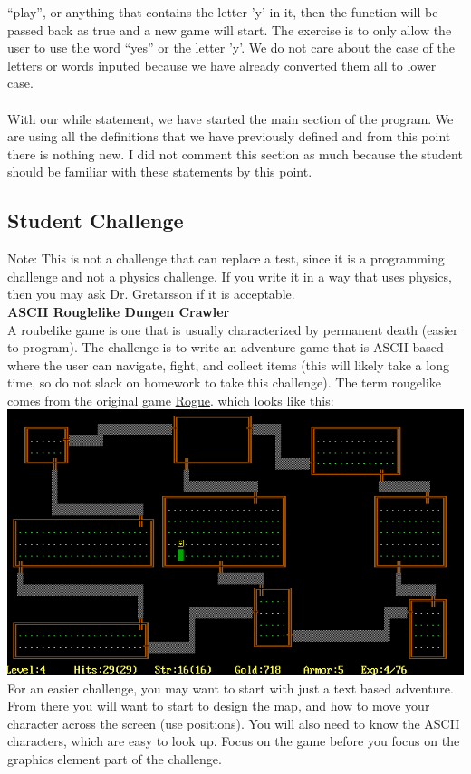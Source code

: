 \documentclass[11pt]{article}   %
\begin{document}
``play'', or anything that contains the letter 'y' in it, then the function will be passed back as true and a 
new game will start.  The exercise is to only allow the user to use the word ``yes'' or the letter 'y'.  We do 
not care about the case of the letters or words inputed because we have already converted them all to  lower case.
\\
\\
With our while statement, we have started the main section of the program.  We are using all the definitions that 
we have previously defined and from this point there is nothing new.  I did not comment this section as much
because the student should be familiar with these statements by this point.

\subsection*{Student Challenge}
Note: This is not a challenge that can replace a test, since it is a programming challenge and not a physics challenge.  If you write it in a way that uses physics, then you may ask Dr. Gretarsson if it is acceptable.
\\\textbf{ASCII Rouglelike Dungen Crawler}\\
A roubelike game is one that is usually characterized by permanent death (easier to program).  The challenge is to
write an adventure game that is ASCII based where the user can navigate, fight, and collect items (this will
likely take a long time, so do not slack on homework to take this challenge).  The term rougelike comes from the
original game \href{http://en.wikipedia.org/wiki/Rogue_(video_game)}{Rogue}. which looks like this:
\\
\includegraphics[scale=0.79]{Rogue.png}
\\
For an easier challenge, you may want to start with just a text based adventure.  From there you will want to 
start to design the map, and how to move your character across the screen (use positions).  You will also need to
know the ASCII characters, which are easy to look up.  Focus on the game before you focus on the graphics element
part of the challenge.
\end{document}
